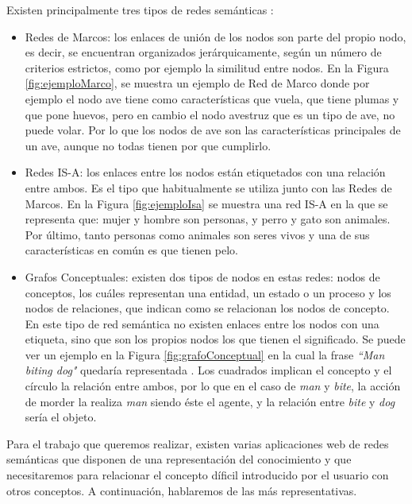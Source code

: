 Existen principalmente tres tipos de redes semánticas \citep{tiposRedesSemanticas}:
\begin{itemize}
	\item Redes de Marcos: los enlaces de unión de los nodos son parte del propio nodo, es decir, se encuentran organizados jerárquicamente, según un número de criterios estrictos, como por ejemplo la similitud entre nodos. En la Figura \ref{fig:ejemploMarco}, se muestra un ejemplo de Red de Marco donde por ejemplo el nodo ave tiene como características  que vuela, que tiene plumas y que pone huevos, pero en cambio el nodo avestruz que es un tipo de ave, no puede volar. Por lo que los nodos de ave son las características principales de un ave, aunque no todas tienen por que cumplirlo.
	\item Redes IS-A: los enlaces entre los nodos están etiquetados con una relación entre ambos. Es el tipo que habitualmente se utiliza junto con las Redes de Marcos. En la Figura \ref{fig:ejemploIsa} se muestra una red IS-A en la que se representa que: mujer y hombre son personas, y perro y gato son animales. Por último, tanto personas como animales son seres vivos y una de sus características en común es que tienen pelo.
	\item Grafos Conceptuales: existen dos tipos de nodos en estas redes: nodos de conceptos, los cuáles representan una entidad, un estado o un proceso y los nodos de relaciones, que indican como se relacionan los nodos de concepto. En este tipo de red semántica no existen enlaces entre los nodos con una etiqueta, sino que son los propios nodos los que tienen el significado. Se puede ver un ejemplo en la Figura \ref{fig:grafoConceptual} en la cual la frase \textit{``Man biting dog"} quedaría representada \citep{osti_5673179}. Los cuadrados implican el concepto y el círculo la relación entre ambos, por lo que en el caso de \textit{man} y \textit{bite}, la acción de morder la realiza \textit{man} siendo éste el agente, y la relación entre \textit{bite} y \textit{dog} sería el objeto.
\end{itemize}
Para el trabajo que queremos realizar, existen varias aplicaciones web de redes semánticas que disponen de una representación del conocimiento y que necesitaremos para relacionar el concepto díficil introducido por el usuario con otros conceptos. A continuación, hablaremos de las más representativas.

